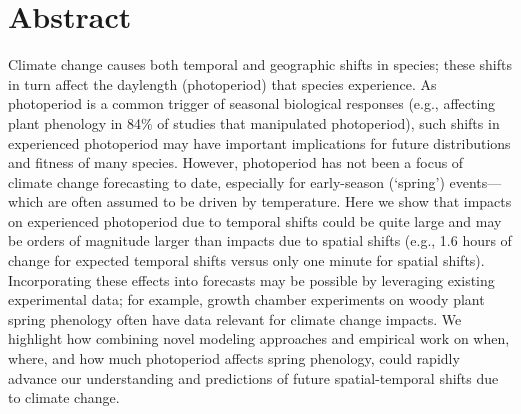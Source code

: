 \documentclass{article}
\begin{document}



\section*{Abstract}
Climate change causes both temporal and geographic shifts in species; these shifts in turn affect the daylength (photoperiod) that species experience. As photoperiod is a common trigger of seasonal biological responses (e.g., affecting plant phenology in 84\% of studies that manipulated photoperiod), such shifts in experienced photoperiod may have important implications for future distributions and fitness of many species. However, photoperiod has not been a focus of climate change forecasting to date, especially for early-season (`spring') events---which are often assumed to be driven by temperature. Here we show that impacts on experienced photoperiod due to temporal shifts could be quite large and may be orders of magnitude larger than impacts due to spatial shifts (e.g., 1.6 hours of change for expected temporal shifts versus only one minute for spatial shifts). Incorporating these effects into forecasts may be possible by leveraging existing experimental data; for example, growth chamber experiments on woody plant spring phenology often have data relevant for climate change impacts. We highlight how combining novel modeling approaches and empirical work on when, where, and how much photoperiod affects spring phenology, could rapidly advance our understanding and predictions of future spatial-temporal shifts due to climate change. %
\end{document}
